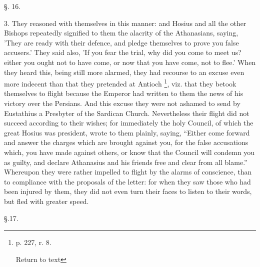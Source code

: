 §. 16.

3. They reasoned with themselves in this manner:
and Hosius and all the other Bishops repeatedly signified to
them the alacrity of the Athanasians, saying, 'They are ready with
their defence, and pledge themselves to prove you false accusers.'
They said also, 'If you fear the trial, why did you come to meet us?
either you ought not to have come, or now that you have come, not to
flee.' When they heard this, being still more alarmed, they had
recourse to an excuse even more indecent than that they pretended at
Antioch \footnote{p. 227, r. 8.

Return to text}, viz. that
they betook themselves to flight because the Emperor had written to
them the news of his victory over the Persians. And this excuse they
were not ashamed to send by Eustathius a Presbyter of the Sardican
Church. Nevertheless their flight did not succeed according to their
wishes; for immediately the holy Council, of which the great Hosius
was president, wrote to them plainly, saying, ``Either come forward and
answer the charges which are brought against you, for the false
accusations which, you have made against others, or know that the
Council will condemn you as guilty, and declare Athanasius and his
friends free and clear from all blame.'' Whereupon they were rather
impelled to flight by the alarms of conscience, than to compliance
with the proposals of the letter: for when they saw those who had been
injured by them, they did not even turn their faces to listen to their
words, but fled with greater speed.

§.17.

